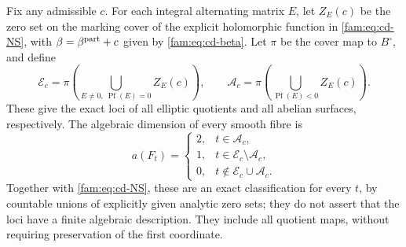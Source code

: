 \begin{theorem}\label{fam:src:D.1.6}\label{fam:st:D.1.6}
Fix any admissible $c$. For each integral alternating matrix $E$, let
$Z_E(c)$ be the zero set on the marking cover of the explicit holomorphic
function in \eqref{fam:eq:cd-NS}, with $\beta=\beta^{\rm part}+c$ given by
\eqref{fam:eq:cd-beta}. Let $\pi$ be the cover map to $B^\circ$, and define
\[
 \mathcal E_c=\pi\!\left(\bigcup_{E\ne0,\ \operatorname{Pf}(E)=0}Z_E(c)\right),
 \qquad
 \mathcal A_c=\pi\!\left(\bigcup_{\operatorname{Pf}(E)<0}Z_E(c)\right).
\]
These give the exact loci of all elliptic quotients and all abelian
surfaces, respectively. The algebraic dimension of every smooth fibre is
\[
 a(F_t)=
 \begin{cases}
 2,&t\in\mathcal A_c,\\
 1,&t\in\mathcal E_c\setminus\mathcal A_c,\\
 0,&t\notin\mathcal E_c\cup\mathcal A_c.
 \end{cases}
\]
Together with \eqref{fam:eq:cd-NS}, these are an exact classification for every
$t$, by countable unions of explicitly given analytic zero sets; they do
not assert that the loci have a finite algebraic description. They include
all quotient maps, without requiring preservation of the first coordinate.
\end{theorem}

